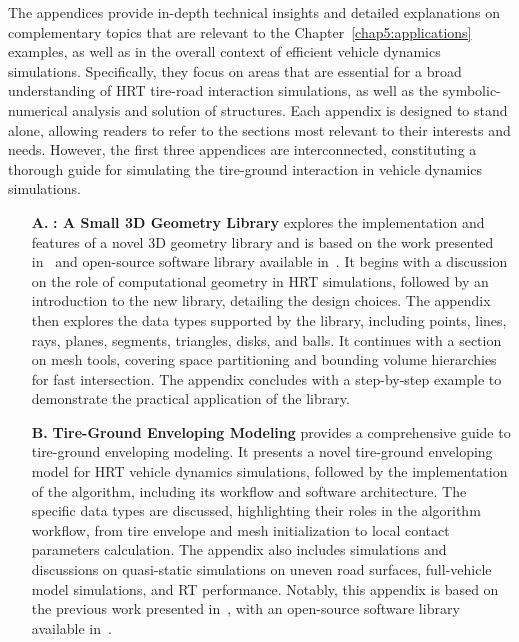 The appendices provide in-depth technical insights and detailed explanations on complementary topics that are relevant to the Chapter~\ref{chap5:applications} examples, as well as in the overall context of efficient vehicle dynamics simulations. Specifically, they focus on areas that are essential for a broad understanding of \ac{HRT} tire-road interaction simulations, as well as the symbolic-numerical analysis and solution of structures. Each appendix is designed to stand alone, allowing readers to refer to the sections most relevant to their interests and needs. However, the first three appendices are interconnected, constituting a thorough guide for simulating the tire-ground interaction in vehicle dynamics simulations.
%
\begin{enumerate}
  \item[\textbf{A.}] \textbf{\Acme{}: A Small 3D Geometry Library} explores the implementation and features of a novel 3D geometry library and is based on the work presented in~\cite{stocco2021acme} and open-source software library available in~\cite{acme}. It begins with a discussion on the role of computational geometry in \ac{HRT} simulations, followed by an introduction to the new library, detailing the design choices. The appendix then explores the data types supported by the library, including points, lines, rays, planes, segments, triangles, disks, and balls. It continues with a section on mesh tools, covering space partitioning and bounding volume hierarchies for fast intersection. The appendix concludes with a step-by-step example to demonstrate the practical application of the library.
  \item[\textbf{B.}] \textbf{Tire-Ground Enveloping Modeling} provides a comprehensive guide to tire-ground enveloping modeling. It presents a novel tire-ground enveloping model for \ac{HRT} vehicle dynamics simulations, followed by the implementation of the algorithm, including its workflow and software architecture. The specific data types are discussed, highlighting their roles in the algorithm workflow, from tire envelope and mesh initialization to local contact parameters calculation. The appendix also includes simulations and discussions on quasi-static simulations on uneven road surfaces, full-vehicle model simulations, and \ac{RT} performance. Notably, this appendix is based on the previous work presented in~\cite{stocco2024novel}, with an open-source software library available in~\cite{enve}.

\end{enumerate}
